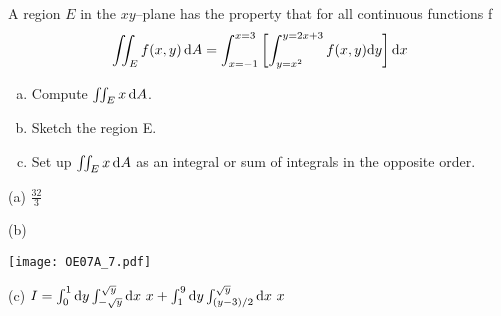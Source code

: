 \begin{question}[M200 2007A] \label{prob_s3.1f}  %
A region $E$ in the $xy$--plane has the property that for all 
continuous functions f
\begin{equation*}
\iint_E f(x,y)\,\mathrm{d}A
= \int_{x=-1}^{x=3}\left[\int_{y=x^2}^{y=2x+3} f(x,y) \mathrm{d}y\right] \mathrm{d}x
\end{equation*}

\begin{enumerate}[(a)]
\item 
 Compute $\iint_E x\,\mathrm{d}A$.
 
\item 
 Sketch the region E.

\item
 Set up $\iint_E x\,\mathrm{d}A$ as an integral or sum of integrals 
in the opposite order.
\end{enumerate}
\end{question}

%

\begin{answer}
(a) $\frac{32}{3}$

(b)

\begin{center}
     \texttt{[image: OE07A\_7.pdf]}
\end{center}

(c) $I = \int_0^1\mathrm{d}y \int_{-\sqrt{y}}^{\sqrt{y}}\mathrm{d}x\ x
    +\int_1^9\mathrm{d}y \int_{(y-3)/2}^{\sqrt{y}}\mathrm{d}x\ x$
\end{answer}

